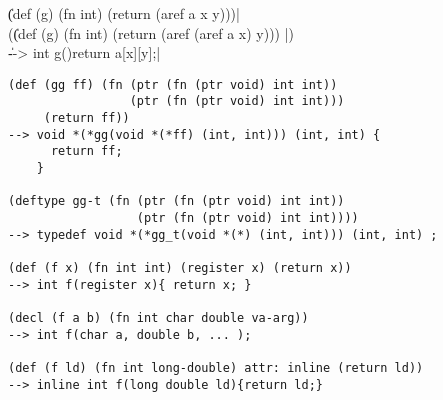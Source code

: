 \|(def (g) (fn int) (return (aref a x y)))|\\
(\| (def (g) (fn int) (return (aref (aref a x) y))) |)\\
\|--> int g(){return a[x][y];}|
\begin{verbatim}
(def (gg ff) (fn (ptr (fn (ptr void) int int))
                 (ptr (fn (ptr void) int int)))
     (return ff))  
--> void *(*gg(void *(*ff) (int, int))) (int, int) {
      return ff;
    }

(deftype gg-t (fn (ptr (fn (ptr void) int int))
                  (ptr (fn (ptr void) int int))))
--> typedef void *(*gg_t(void *(*) (int, int))) (int, int) ;

(def (f x) (fn int int) (register x) (return x))
--> int f(register x){ return x; }

(decl (f a b) (fn int char double va-arg))
--> int f(char a, double b, ... );

(def (f ld) (fn int long-double) attr: inline (return ld))
--> inline int f(long double ld){return ld;}
\end{verbatim}

